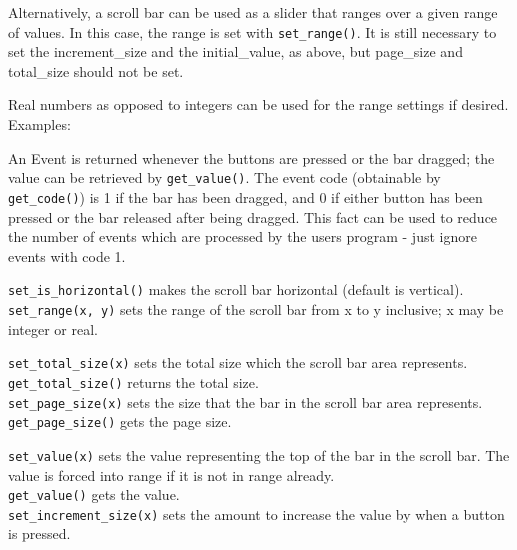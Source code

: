 Alternatively, a scroll bar can be used as a slider that ranges over a
given range of values. In this case, the range is set with
\texttt{set\_range()}. It is still necessary to set the increment\_size and the
initial\_value, as above, but page\_size and total\_size should not be
set.

Real numbers as opposed to integers can be used for the range settings
if desired. Examples:


An Event is returned whenever the buttons are pressed or the bar
dragged; the value can be retrieved by \texttt{get\_value()}. The event code
(obtainable by \texttt{get\_code()}) is 1 if the bar has been dragged, and 0 if
either button has been pressed or the bar released after being dragged.
This fact can be used to reduce the number of events which are
processed by the user{\textquotesingle}s program - just ignore events
with code 1.

\texttt{set\_is\_horizontal()} makes the scroll bar horizontal (default is
vertical).\\
\texttt{set\_range(x, y)} sets the range of the scroll bar from x to y
inclusive; x may be integer or real.

\texttt{set\_total\_size(x)} sets the total size which the scroll bar area
represents.\\
\texttt{get\_total\_size()} returns the total size.\\
\texttt{set\_page\_size(x)} sets the size that the bar in the scroll bar area
represents.\\
\texttt{get\_page\_size()} gets the page size.

\texttt{set\_value(x)} sets the value representing the top of the bar in the
scroll bar. The value is forced into range if it is not in range
already.\\
\texttt{get\_value()} gets the value.\\
\texttt{set\_increment\_size(x)} sets the amount to increase the value by when a
button is pressed.

